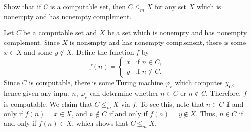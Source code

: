 \begin{problem}
  Show that if $C$ is a computable set, then $C \leq_m X$ for any set
  $X$ which is nonempty and has nonempty complement.

  \begin{answer}
    Let $C$ be a computable set and $X$ be a set which is nonempty and
    has nonempty complement.  Since $X$ is nonempty and has nonempty complement,
    there is some $x \in X$ and some $y \not\in X$.
    Define the function $f$ by
    \[
      f(n) = \begin{cases}
        x & \text{if } n \in C, \\
        y & \text{if } n \not\in C.
      \end{cases}
    \]
    Since $C$ is computable, there is some Turing machine $\varphi_e$
    which computes $\chi_C$, hence given any input $n$, $\varphi_e$
    can determine whether $n \in C$ or $n \not \in C$.
    Therefore, $f$ is computable. We claim that $C
    \leq_m X$ via $f$.  To see this, note that $n \in C$ if and only
    if $f(n) = x \in X$, and $n \not\in C$ if and only if $f(n) = y
    \not\in X$.  Thus, $n \in C$ if and only if $f(n) \in X$, which
    shows that $C \leq_m X$.
  \end{answer}
\end{problem}
